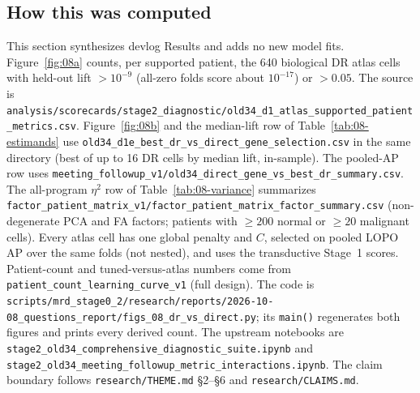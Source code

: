 \subsection*{How this was computed}
{\small\raggedright This section synthesizes devlog Results and adds no new model fits. Figure~\ref{fig:08a} counts, per supported patient, the 640 biological DR atlas cells with held-out lift $>10^{-9}$ (all-zero folds score about $10^{-17}$) or $>0.05$. The source is \nolinkurl{analysis/scorecards/stage2_diagnostic/old34_d1_atlas_supported_patient_metrics.csv}. Figure~\ref{fig:08b} and the median-lift row of Table~\ref{tab:08-estimands} use \nolinkurl{old34_d1e_best_dr_vs_direct_gene_selection.csv} in the same directory (best of up to 16 DR cells by median lift, in-sample). The pooled-AP row uses \nolinkurl{meeting_followup_v1/old34_direct_gene_vs_best_dr_summary.csv}. The all-program $\eta^2$ row of Table~\ref{tab:08-variance} summarizes \nolinkurl{factor_patient_matrix_v1/factor_patient_matrix_factor_summary.csv} (non-degenerate PCA and FA factors; patients with $\geq 200$ normal or $\geq 20$ malignant cells). Every atlas cell has one global penalty and $C$, selected on pooled LOPO AP over the same folds (not nested), and uses the transductive Stage~1 scores. Patient-count and tuned-versus-atlas numbers come from \nolinkurl{patient_count_learning_curve_v1} (full design). The code is \nolinkurl{scripts/mrd_stage0_2/research/reports/2026-10-08_questions_report/figs_08_dr_vs_direct.py}; its \texttt{main()} regenerates both figures and prints every derived count. The upstream notebooks are \nolinkurl{stage2_old34_comprehensive_diagnostic_suite.ipynb} and \nolinkurl{stage2_old34_meeting_followup_metric_interactions.ipynb}. The claim boundary follows \texttt{research/THEME.md} \S2--\S6 and \texttt{research/CLAIMS.md}. \par}
